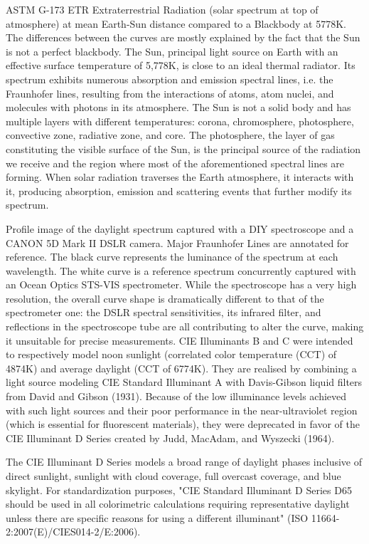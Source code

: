 ASTM G-173 ETR Extraterrestrial Radiation (solar spectrum at top of atmosphere) at mean Earth-Sun distance compared to a Blackbody at 5778K. The differences between the curves are mostly explained by the fact that the Sun is not a perfect blackbody.
The Sun, principal light source on Earth with an effective surface temperature of 5,778K, is close to an ideal thermal radiator. Its spectrum exhibits numerous absorption and emission spectral lines, i.e. the Fraunhofer lines, resulting from the interactions of atoms, atom nuclei, and molecules with photons in its atmosphere. The Sun is not a solid body and has multiple layers with different temperatures: corona, chromosphere, photosphere, convective zone, radiative zone, and core. The photosphere, the layer of gas constituting the visible surface of the Sun, is the principal source of the radiation we receive and the region where most of the aforementioned spectral lines are forming. When solar radiation traverses the Earth atmosphere, it interacts with it, producing absorption, emission and scattering events that further modify its spectrum.

Profile image of the daylight spectrum captured with a DIY spectroscope and a CANON 5D Mark II DSLR camera. Major Fraunhofer Lines are annotated for reference. The black curve represents the luminance of the spectrum at each wavelength. The white curve is a reference spectrum concurrently captured with an Ocean Optics STS-VIS spectrometer. While the spectroscope has a very high resolution, the overall curve shape is dramatically different to that of the spectrometer one: the DSLR spectral sensitivities, its infrared filter, and reflections in the spectroscope tube are all contributing to alter the curve, making it unsuitable for precise measurements.
CIE Illuminants B and C were intended to respectively model noon sunlight (correlated color temperature (CCT) of 4874K) and average daylight (CCT of 6774K). They are realised by combining a light source modeling CIE Standard Illuminant A with Davis-Gibson liquid filters from David and Gibson (1931). Because of the low illuminance levels achieved with such light sources and their poor performance in the near-ultraviolet region (which is essential for fluorescent materials), they were deprecated in favor of the CIE Illuminant D Series created by Judd, MacAdam, and Wyszecki (1964). 

The CIE Illuminant D Series models a broad range of daylight phases inclusive of direct sunlight, sunlight with cloud coverage, full overcast coverage, and blue skylight. For standardization purposes, "CIE Standard Illuminant D Series D65 should be used in all colorimetric calculations requiring representative daylight unless there are specific reasons for using a different illuminant" (ISO 11664-2:2007(E)/CIES014-2/E:2006).

